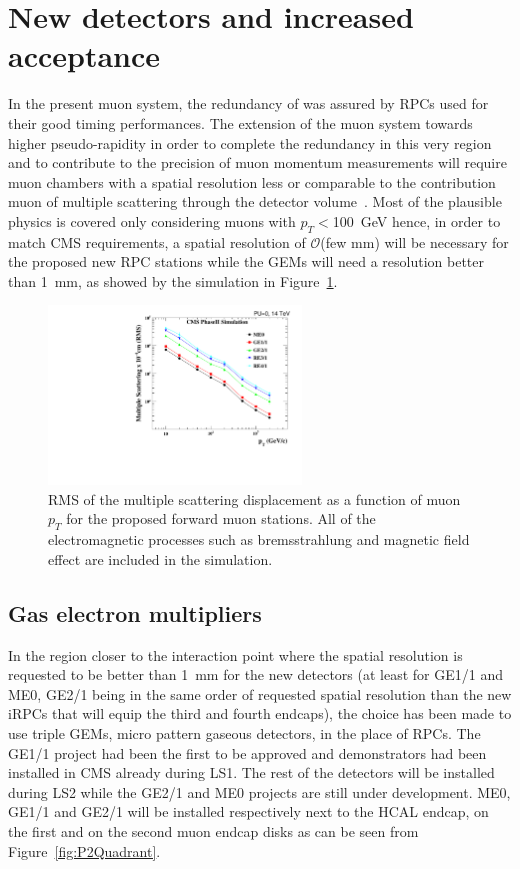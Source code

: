 \section{New detectors and increased acceptance}
\label{chapt3:sec:GEMRPC}

	In the present muon system, the redundancy of was assured by RPCs used for their good timing performances. The extension of the muon system towards higher pseudo-rapidity in order to complete the redundancy in this very region and to contribute to the precision of muon momentum measurements will require muon chambers with a spatial resolution less or comparable to the contribution  muon of multiple scattering through the detector volume~\cite{MUONTDR}. Most of the plausible physics is covered only considering muons with $p_T<$\SI{100}{GeV} hence, in order to match CMS requirements, a spatial resolution of $\mathcal{O}$(few $\mathrm{mm}$) will be necessary for the proposed new RPC stations while the GEMs will need a resolution better than \SI{1}{mm}, as showed by the simulation in Figure~\ref{fig:MultiScat}.

	\begin{figure}[H]
		\centering
		\includegraphics[width=0.6\textwidth]{fig/chapt3/MS_allstations.pdf}
		\caption{\label{fig:MultiScat} RMS of the multiple scattering displacement as a function of muon $p_T$ for the proposed forward muon stations. All of the electromagnetic processes such as bremsstrahlung and magnetic field effect are included in the simulation.}
	\end{figure}
	
	\subsection{Gas electron multipliers}
	\label{chapt3:ssec:GEMs}
	
	In the region closer to the interaction point where the spatial resolution is requested to be better than \SI{1}{mm} for the new detectors (at least for GE1/1 and ME0, GE2/1 being in the same order of requested spatial resolution than the new iRPCs that will equip the third and fourth endcaps), the choice has been made to use triple GEMs, micro pattern gaseous detectors, in the place of RPCs. The GE1/1 project had been the first to be approved and demonstrators had been installed in CMS already during LS1. The rest of the detectors will be installed during LS2 while the GE2/1 and ME0 projects are still under development. ME0, GE1/1 and GE2/1 will be installed respectively next to the HCAL endcap, on the first and on the second muon endcap disks as can be seen from Figure~\ref{fig:P2Quadrant}.

